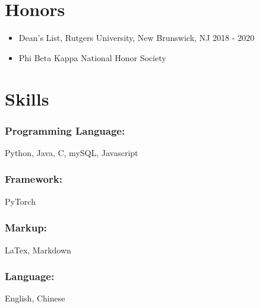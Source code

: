 \documentclass{article}
\begin{document}
\section{Honors}
\begin{itemize}
	\item Dean's List, Rutgers University, New Brunswick, NJ \hfill{2018 - 2020}
	\item Phi Beta Kappa National Honor Society
\end{itemize}

\section{Skills}

\subsubsection{Programming Language:}

Python, Java, C, mySQL,  Javascript

\subsubsection{Framework:}

PyTorch

\subsubsection{Markup:}

LaTex, Markdown

\subsubsection{Language:}
English, Chinese
\end{document}
